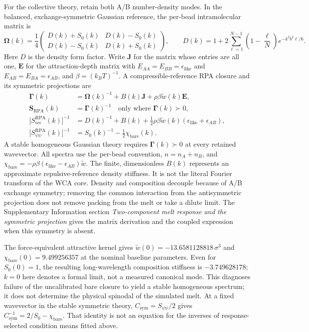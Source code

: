 For the collective theory, retain both A/B number-density modes. In the balanced, exchange-symmetric Gaussian reference, the per-bead intramolecular matrix is
\[
\boldsymbol\Omega(k)=\frac14
\begin{pmatrix}D(k)+S_0(k)&D(k)-S_0(k)\\D(k)-S_0(k)&D(k)+S_0(k)\end{pmatrix},
\qquad
D(k)=1+2\sum_{\ell=1}^{N-1}\left(1-\frac\ell N\right)e^{-k^2b^2\ell/6}.
\]
Here $D$ is the density form factor. Write $\mathbf J$ for the matrix whose entries are all one, $\mathbf E$ for the attraction-depth matrix with $E_{AA}=E_{BB}=\epsilon_{\mathrm{like}}$ and $E_{AB}=E_{BA}=\epsilon_{AB}$, and $\beta=(k_BT)^{-1}$. A compressible-reference RPA closure and its symmetric projections are
\begin{equation}
\begin{aligned}
\boldsymbol\Gamma(k)&=\boldsymbol\Omega(k)^{-1}+B(k)\mathbf J
 +\rho\beta\widetilde w(k)\mathbf E,\\
\mathbf S_{\mathrm{RPA}}(k)&=\boldsymbol\Gamma(k)^{-1}
 \quad\text{only where }\boldsymbol\Gamma(k)\succ0,\\
\bigl[S_{nn}^{\mathrm{RPA}}(k)\bigr]^{-1}
 &=D(k)^{-1}+B(k)+\tfrac12\rho\beta\widetilde w(k)
 (\epsilon_{\mathrm{like}}+\epsilon_{AB}),\\
\bigl[S_{\psi\psi}^{\mathrm{RPA}}(k)\bigr]^{-1}
 &=S_0(k)^{-1}-\tfrac12\chi_{\mathrm{bare}}(k).
\end{aligned}
\label{eq:rpa}
\end{equation}
A stable homogeneous Gaussian theory requires $\boldsymbol\Gamma(k)\succ0$ at every retained wavevector. All spectra use the per-bead convention, $n=n_A+n_B$, and $\chi_{\mathrm{bare}}=-\rho\beta(\epsilon_{\mathrm{like}}-\epsilon_{AB})\widetilde w$. The finite, dimensionless $B(k)$ represents an approximate repulsive-reference density stiffness. It is not the literal Fourier transform of the WCA core. Density and composition decouple because of A/B exchange symmetry; removing the common interaction from the antisymmetric projection does not remove packing from the melt or take a dilute limit. The Supplementary Information section \emph{Two-component melt response and the symmetric projection} gives the matrix derivation and the coupled expression when this symmetry is absent.

The force-equivalent attractive kernel gives $\widetilde w(0)=-13.6581128818\,\sigma^3$ and $\chi_{\mathrm{bare}}(0)=9.499256357$ at the nominal baseline parameters. Even for $S_0(0)=1$, the resulting long-wavelength composition stiffness is $-3.749628178$; $k=0$ here denotes a formal limit, not a measured canonical mode. This diagnoses failure of the uncalibrated bare closure to yield a stable homogeneous spectrum; it does not determine the physical spinodal of the simulated melt. At a fixed wavevector in the stable symmetric theory, $C_{\mathrm{sym}}=S_{\psi\psi}/2$ gives $C_{\mathrm{sym}}^{-1}=2/S_0-\chi_{\mathrm{bare}}$. That identity is not an equation for the inverses of response-selected condition means fitted above.

